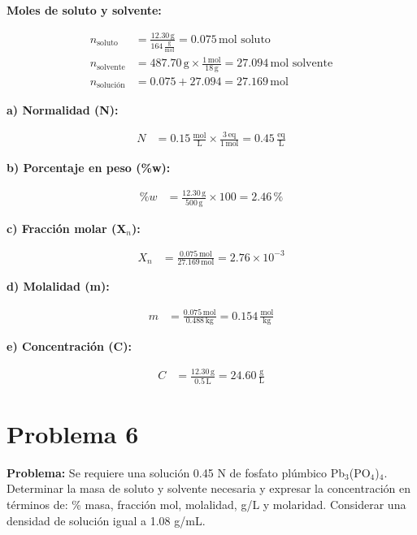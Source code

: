 \documentclass{article}
\begin{document}
\begin{multicols}{2}
\textbf{Moles de soluto y solvente:}

\begin{align*}
    n_{\text{soluto}} &= \frac{12.30 \, \text{g}}{164 \, \frac{\text{g}}{\text{mol}}} = 0.075 \, \text{mol soluto} \\[10pt]
    n_{\text{solvente}} &= 487.70 \, \text{g} \times \frac{1 \, \text{mol}}{18 \, \text{g}} = 27.094 \, \text{mol solvente} \\[10pt]
    n_{\text{solución}} &= 0.075 + 27.094 = 27.169 \, \text{mol}
\end{align*}

\textbf{a) Normalidad (N):}

\begin{align*}
    N &= 0.15 \, \frac{\text{mol}}{\text{L}} \times \frac{3 \, \text{eq}}{1 \, \text{mol}} = 0.45 \, \frac{\text{eq}}{\text{L}}
\end{align*}

\textbf{b) Porcentaje en peso (\%w):}

\begin{align*}
    \%w &= \frac{12.30 \, \text{g}}{500 \, \text{g}} \times 100 = 2.46 \, \%
\end{align*}

\textbf{c) Fracción molar (X$_n$):}

\begin{align*}
    X_n &= \frac{0.075 \, \text{mol}}{27.169 \, \text{mol}} = 2.76 \times 10^{-3}
\end{align*}

\textbf{d) Molalidad (m):}

\begin{align*}
    m &= \frac{0.075 \, \text{mol}}{0.488 \, \text{kg}} = 0.154 \, \frac{\text{mol}}{\text{kg}}
\end{align*}

\textbf{e) Concentración (C):}

\begin{align*}
    C &= \frac{12.30 \, \text{g}}{0.5 \, \text{L}} = 24.60 \, \frac{\text{g}}{\text{L}}
\end{align*}

\end{multicols} %









\newpage
\section*{Problema 6}
\textbf{Problema:}
Se requiere una solución 0.45 N de fosfato plúmbico Pb$_3$(PO$_4$)$_4$. Determinar la masa de soluto y solvente necesaria y expresar la concentración en términos de: \% masa, fracción mol, molalidad, g/L y molaridad. Considerar una densidad de solución igual a 1.08 g/mL.
\end{document}
